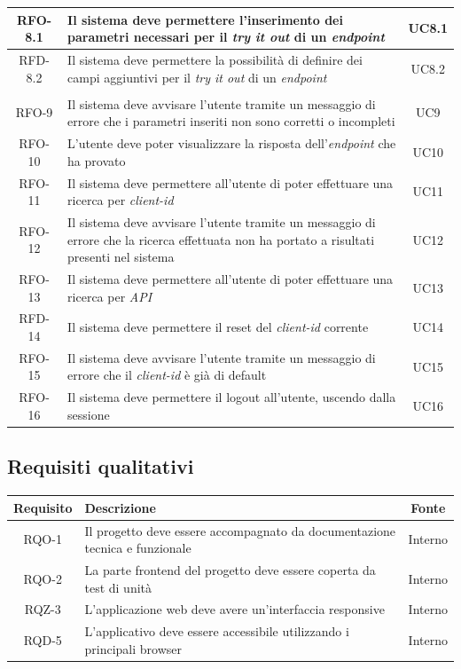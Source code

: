 \begin{center}
\begin{longtable}{|c|p{}|c|}
\hline
RFO-8.1 &Il sistema deve permettere l'inserimento dei parametri necessari per il \textit{try it out} di un \textit{endpoint} & UC8.1 \\
\hline
RFD-8.2 &Il sistema deve permettere la possibilità di definire dei campi aggiuntivi per il \textit{try it out} di un \textit{endpoint} & UC8.2 \\
\hline\pagebreak\hline
\multicolumn{3}{|c|}{\textbf{Continuazione della tabella~\ref{tab:requisiti-funzionali}}} \\
\hline
RFO-9 &Il sistema deve avvisare l'utente tramite un messaggio di errore che i parametri inseriti non sono corretti o incompleti & UC9 \\
\hline
RFO-10 &L'utente deve poter visualizzare la risposta dell'\textit{endpoint} che ha provato & UC10 \\
\hline
RFO-11 &Il sistema deve permettere all'utente di poter effettuare una ricerca per \textit{client-id} & UC11 \\
\hline
RFO-12 &Il sistema deve avvisare l'utente tramite un messaggio di errore che la ricerca effettuata non ha portato a risultati presenti nel sistema & UC12 \\
\hline
RFO-13 &Il sistema deve permettere all'utente di poter effettuare una ricerca per \textit{API} & UC13 \\
\hline
RFD-14 &Il sistema deve permettere il reset del \textit{client-id} corrente & UC14 \\
\hline
RFO-15 &Il sistema deve avvisare l'utente tramite un messaggio di errore che il \textit{client-id} è già di default & UC15 \\
\hline
RFO-16 &Il sistema deve permettere il logout all'utente, uscendo dalla sessione  & UC16 \\
\hline
\end{longtable}
\end{center}

\subsection{Requisiti qualitativi}\label{subsec:requisiti-qualitativi}

\begin{center}
\label{tab:requisiti-qualitativi}
\begin{longtable}{|c|p{}|c|}
\hline
\textbf{Requisito} & \textbf{Descrizione} & \textbf{Fonte}\\
\hline
RQO-1 &Il progetto deve essere accompagnato da documentazione tecnica e funzionale & Interno \\
\hline
RQO-2 &La parte frontend del progetto deve essere coperta da test di unità & Interno \\
\hline
RQZ-3 &L'applicazione web deve avere un'interfaccia responsive & Interno \\
\hline
RQD-5 &L'applicativo deve essere accessibile utilizzando i principali browser & Interno \\
\hline
\end{longtable}
\end{center}

